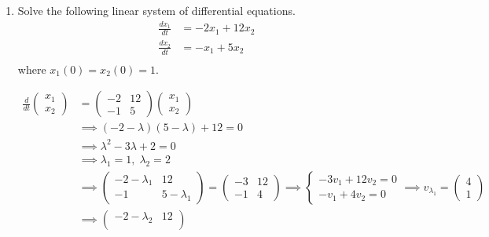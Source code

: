 \documentclass[12pt]{article}
\begin{document}
\begin{enumerate}
\item Solve the following linear system of differential equations.
\begin{align*}
    \frac{dx_{1}}{dt} &= -2x_{1} + 12x_{2} \\
    \frac{dx_{2}}{dt} &= -x_{1} + 5x_{2} \\
\end{align*}
where $x_{1}(0) = x_{2}(0) = 1$. 

    \color{blue}
        \begin{align*}
            \frac{d}{dt} \begin{pmatrix}
                x_1\\x_2
            \end{pmatrix} &= \begin{pmatrix}
                -2 & 12\\ 
                -1 & 5
            \end{pmatrix} \begin{pmatrix}
                x_1\\ x_2
            \end{pmatrix}\\ 
            &\implies (-2 - \lambda)(5 - \lambda) + 12 = 0\\
            &\implies \lambda^2 - 3\lambda + 2 = 0\\
            &\implies \lambda_1 = 1, \; \lambda_2 = 2\\
            &\implies \begin{pmatrix}
                -2 - \lambda_1 & 12\\ 
                -1 & 5 - \lambda_1
            \end{pmatrix} = \begin{pmatrix}
                -3 & 12\\ 
                -1 & 4
            \end{pmatrix} \implies \begin{cases}
                -3v_1 + 12v_2 = 0\\
                -v_1 + 4v_2 = 0
            \end{cases} \implies v_{\lambda_1} = \begin{pmatrix}
                4\\ 1
            \end{pmatrix}\\
            &\implies \begin{pmatrix}
                -2 - \lambda_2 & 12\\

\end{pmatrix}
\end{align*}
\end{enumerate}
\end{document}
